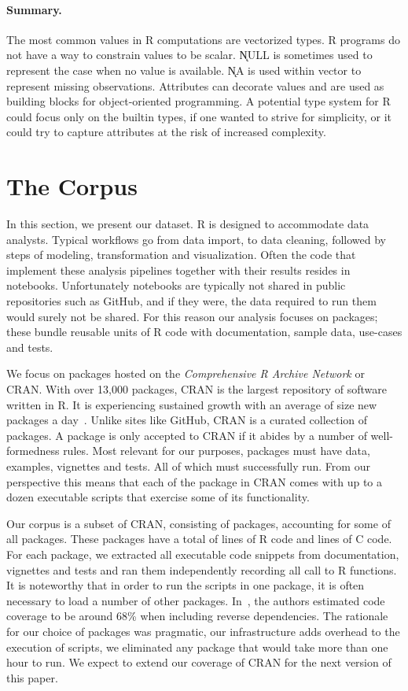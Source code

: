 \documentclass[acmsmall,10pt,review,anonymous]{acmart}\settopmatter{printfolios=true,printccs=false,printacmref=false}
\begin{document}
\paragraph{Summary.} The most common values in R computations are vectorized
types. R programs do not have a way to constrain values to be scalar.
\k{NULL} is sometimes used to represent the case when no value is
available. \k{NA} is used within vector to represent missing observations.
Attributes can decorate values and are used as building blocks for
object-oriented programming. A potential type system for R could focus only
on the builtin types, if one wanted to strive for simplicity, or it could
try to capture attributes at the risk of increased complexity.

\newpage
\section{The Corpus}\label{sec:corpus}

In this section, we present our dataset. R is designed to accommodate data
analysts.  Typical workflows go from data import, to data cleaning, followed
by steps of modeling, transformation and visualization. Often the code that
implement these analysis pipelines together with their results resides in
notebooks. Unfortunately notebooks are typically not shared in public
repositories such as GitHub, and if they were, the data required to run them
would surely not be shared. For this reason our analysis focuses on
packages; these bundle reusable units of R code with documentation, sample
data, use-cases and tests.

We focus on packages hosted on the \emph{Comprehensive R Archive Network} or
CRAN.  With over 13,000 packages, CRAN is the largest repository of software
written in R. It is experiencing sustained growth with an average of size
new packages a day~\cite{LIgges2017}.  Unlike sites like GitHub, CRAN is a
curated collection of packages. A package is only accepted to CRAN if it
abides by a number of well-formedness rules.  Most relevant for our
purposes, packages must have data, examples, vignettes and tests. All of
which must successfully run. From our perspective this means that each of
the package in CRAN comes with up to a dozen executable scripts that
exercise some of its functionality.


Our corpus is a subset of CRAN, consisting of \PACKAGES packages, accounting
for some \PERCENTCRAN of all packages.  These packages have a total of \RLOC
lines of R code and \CLOC lines of C code. For each package, we extracted
all executable code snippets from documentation, vignettes and tests and ran
them independently recording all call to R functions.  It is noteworthy that
in order to run the scripts in one package, it is often necessary to load a
number of other packages.  In~\cite{issta18}, the authors estimated code
coverage to be around 68\% when including reverse dependencies.  The
rationale for our choice of packages was pragmatic, our infrastructure adds
overhead to the execution of scripts, we eliminated any package that would
take more than one hour to run. We expect to extend our coverage of CRAN for
the next version of this paper.
\end{document}
